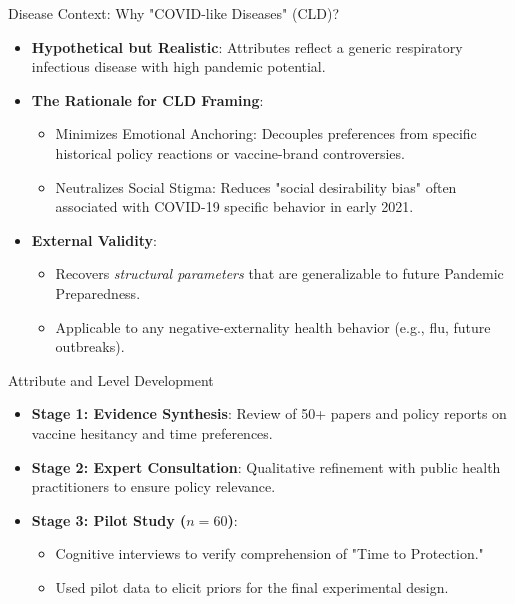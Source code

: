 \documentclass[10pt]{beamer}
\begin{document}
\begin{frame}{Disease Context: Why "COVID-like Diseases" (CLD)?}
    \begin{itemize}
        \item \textbf{Hypothetical but Realistic}: Attributes reflect a generic respiratory infectious disease with high pandemic potential.
        \item \textbf{The Rationale for CLD Framing}:
        \begin{itemize}
            \item \alert{Minimizes Emotional Anchoring}: Decouples preferences from specific historical policy reactions or vaccine-brand controversies.
            \item \alert{Neutralizes Social Stigma}: Reduces "social desirability bias" often associated with COVID-19 specific behavior in early 2021.
        \end{itemize}
        \item \textbf{External Validity}:
        \begin{itemize}
            \item Recovers \textit{structural parameters} that are generalizable to future \alert{Pandemic Preparedness}.
            \item Applicable to any negative-externality health behavior (e.g., flu, future outbreaks).
        \end{itemize}
    \end{itemize}
\end{frame}

\begin{frame}{Attribute and Level Development}
    \begin{itemize}
        \item \textbf{Stage 1: Evidence Synthesis}: Review of 50+ papers and policy reports on vaccine hesitancy and time preferences.
        \item \textbf{Stage 2: Expert Consultation}: Qualitative refinement with public health practitioners to ensure policy relevance.
        \item \textbf{Stage 3: Pilot Study ($n=60$)}:
        \begin{itemize}
            \item Cognitive interviews to verify comprehension of "Time to Protection."
            \item Used pilot data to elicit \alert{priors} for the final experimental design.
        \end{itemize}
    \end{itemize}
\end{frame}
\end{document}
